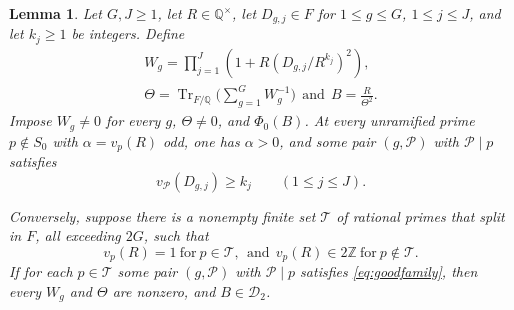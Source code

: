 \documentclass[11pt,reqno]{amsart}
\newtheorem{lemma}[theorem]{Lemma}
\theoremstyle{definition}
\numberwithin{equation}{section}
\newcommand{\Q}{\mathbb Q}
\newcommand{\Z}{\mathbb Z}
\newcommand{\Tr}{\operatorname{Tr}}
\def\bg{\bigg}
\def\({\bg(}
\def\){\bg)}
\def\t{\text}
\def\f{\frac}
\begin{document}
\begin{lemma}\label{lem:packing}
Let $G,J\ge1$, let $R\in\Q^\times$, let $D_{g,j}\in F$ for $1\le g\le G$, $1\le j\le J$, and let $k_j\ge1$ be integers. Define
\begin{gather}
 W_g=\prod_{j=1}^J\left(1+R(D_{g,j}/R^{k_j})^2\right),\label{eq:packing}\\
 \Theta=\Tr_{F/\Q}\(\sum_{g=1}^G W_g^{-1}\)\ \ \t{and}\ \
 B=\f{R}{\Theta^2}.\label{eq:traceaggregate}
\end{gather}
Impose $W_g\ne0$ for every $g$, $\Theta\ne0$, and $\Phi_0(B)$. At every unramified prime $p\notin S_0$ with $\alpha=v_p(R)$ odd, one has $\alpha>0$, and some pair $(g,{\mathcal P})$ with ${\mathcal P}\mid p$ satisfies
\begin{equation}\label{eq:goodfamily}
 v_{\mathcal P}(D_{g,j})\ge k_j\qquad(1\le j\le J).
\end{equation}

Conversely, suppose there is a nonempty finite set $\mathcal T$ of rational primes that split in $F$, all exceeding $2G$, such that
\begin{equation}\label{eq:Rnormalized}
 v_p(R)=1\ \t{for}\ p\in\mathcal T,\ \ \t{and}\ \ v_p(R)\in2\Z\ \t{for}\ p\notin\mathcal T.
\end{equation}
If for each $p\in\mathcal T$ some pair $(g,{\mathcal P})$ with ${\mathcal P}\mid p$ satisfies \eqref{eq:goodfamily}, then every $W_g$ and $\Theta$ are nonzero, and $B\in\mathcal D_2$.
\end{lemma}
\end{document}
